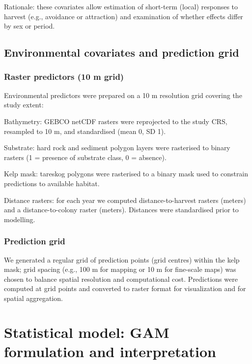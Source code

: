 \documentclass[
  letterpaper,
  DIV=11,
  numbers=noendperiod]{scrartcl}
\begin{document}
Rationale: these covariates allow estimation of short-term (local)
responses to harvest (e.g., avoidance or attraction) and examination of
whether effects differ by sex or period.

\subsection{Environmental covariates and prediction
grid}\label{environmental-covariates-and-prediction-grid}

\subsubsection{Raster predictors (10 m
grid)}\label{raster-predictors-10-m-grid}

Environmental predictors were prepared on a 10 m resolution grid
covering the study extent:

Bathymetry: GEBCO netCDF rasters were reprojected to the study CRS,
resampled to 10 m, and standardised (mean 0, SD 1).

Substrate: hard rock and sediment polygon layers were rasterised to
binary rasters (1 = presence of substrate class, 0 = absence).

Kelp mask: tareskog polygons were rasterised to a binary mask used to
constrain predictions to available habitat.

Distance rasters: for each year we computed distance-to-harvest rasters
(meters) and a distance-to-colony raster (meters). Distances were
standardised prior to modelling.

\subsubsection{Prediction grid}\label{prediction-grid}

We generated a regular grid of prediction points (grid centres) within
the kelp mask; grid spacing (e.g., 100 m for mapping or 10 m for
fine-scale maps) was chosen to balance spatial resolution and
computational cost. Predictions were computed at grid points and
converted to raster format for visualization and for spatial
aggregation.

\section{Statistical model: GAM formulation and
interpretation}\label{statistical-model-gam-formulation-and-interpretation}
\end{document}
